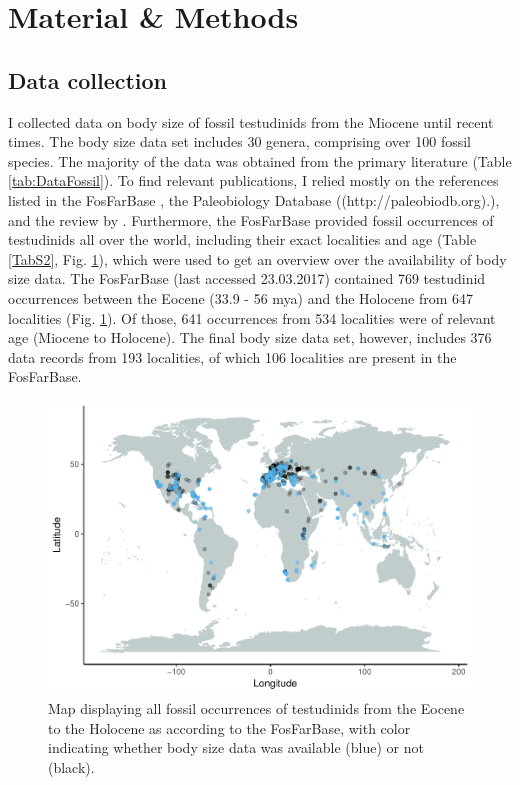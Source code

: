 \section{Material \& Methods}

\subsection{Data collection}
I collected data on body size of fossil testudinids from the Miocene until recent times. The body size data set includes 30 genera, comprising over 100 fossil species. The majority of the data was obtained from the primary literature (Table \ref{tab:DataFossil}). To find relevant publications, I relied mostly on the references listed in the FosFarBase \citep{Bohme2003b}, the Paleobiology Database ((http://paleobiodb.org).), and the review by \cite{rhodin2015turtles}.
Furthermore, the FosFarBase provided fossil occurrences of testudinids all over the world, including their exact localities and age (Table \ref{TabS2}, Fig. \ref{fig:mapOc}), which were used to get an overview over the availability of body size data. The FosFarBase (last accessed 23.03.2017) contained 769 testudinid occurrences between the Eocene (33.9 - 56 mya) and the Holocene from 647 localities (Fig. \ref{fig:mapOc}). Of those, 641 occurrences from 534 localities were of relevant age (Miocene to Holocene). The final body size data set, however, includes 376 data records from 193 localities, of which 106 localities are present in the FosFarBase.


 \begin{figure}[htbp]
 	\centering
 	\includegraphics[width=\textwidth]{MA_JJ_files/figure-latex/MapFossilOccurrences-1.pdf}
 	\caption[Map: fossil occurences]{Map displaying all fossil occurrences of testudinids from the Eocene to the Holocene as according to the FosFarBase, with
 		color indicating whether body size data was available (blue) or not (black).}
 	\label{fig:mapOc}
 \end{figure}

